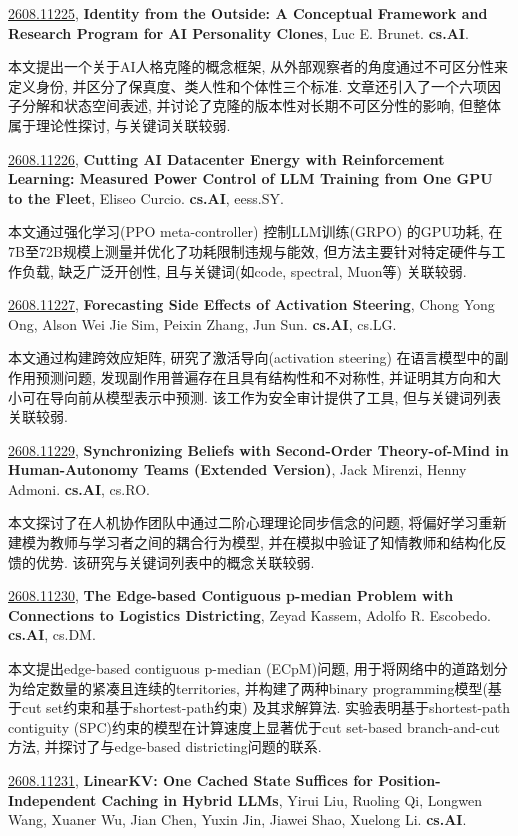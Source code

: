 \documentclass[9pt, a4paper]{article}
\theoremstyle{plain}
\theoremstyle{definition}
\theoremstyle{remark}
\newcommand{\arxivwithtarget}[3]{\hypertarget{#1}{}\href{https://arxiv.org/abs/#1}{#1}, \textbf{\textcolor{arxivblue}{#2}}, #3. }
\begin{document}
\arxivwithtarget{2608.11225}{Identity from the Outside: A Conceptual Framework and Research Program for AI Personality Clones}{Luc E. Brunet}\textbf{cs.AI}.

本文提出一个关于AI人格克隆的概念框架, 从外部观察者的角度通过不可区分性来定义身份, 并区分了保真度、类人性和个体性三个标准. 文章还引入了一个六项因子分解和状态空间表述, 并讨论了克隆的版本性对长期不可区分性的影响, 但整体属于理论性探讨, 与关键词关联较弱.


\arxivwithtarget{2608.11226}{Cutting AI Datacenter Energy with Reinforcement Learning: Measured Power Control of LLM Training from One GPU to the Fleet}{Eliseo Curcio}\textbf{cs.AI}, eess.SY.

本文通过强化学习(PPO meta-controller) 控制LLM训练(GRPO) 的GPU功耗, 在7B至72B规模上测量并优化了功耗限制违规与能效, 但方法主要针对特定硬件与工作负载, 缺乏广泛开创性, 且与关键词(如code, spectral, Muon等) 关联较弱.


\arxivwithtarget{2608.11227}{Forecasting Side Effects of Activation Steering}{Chong Yong Ong, Alson Wei Jie Sim, Peixin Zhang, Jun Sun}\textbf{cs.AI}, cs.LG.

本文通过构建跨效应矩阵, 研究了激活导向(activation steering) 在语言模型中的副作用预测问题, 发现副作用普遍存在且具有结构性和不对称性, 并证明其方向和大小可在导向前从模型表示中预测. 该工作为安全审计提供了工具, 但与关键词列表关联较弱.


\arxivwithtarget{2608.11229}{Synchronizing Beliefs with Second-Order Theory-of-Mind in Human-Autonomy Teams (Extended Version)}{Jack Mirenzi, Henny Admoni}\textbf{cs.AI}, cs.RO.

本文探讨了在人机协作团队中通过二阶心理理论同步信念的问题, 将偏好学习重新建模为教师与学习者之间的耦合行为模型, 并在模拟中验证了知情教师和结构化反馈的优势. 该研究与关键词列表中的概念关联较弱.


\arxivwithtarget{2608.11230}{The Edge-based Contiguous p-median Problem with Connections to Logistics Districting}{Zeyad Kassem, Adolfo R. Escobedo}\textbf{cs.AI}, cs.DM.

本文提出edge-based contiguous p-median (ECpM)问题, 用于将网络中的道路划分为给定数量的紧凑且连续的territories, 并构建了两种binary programming模型(基于cut set约束和基于shortest-path约束) 及其求解算法. 实验表明基于shortest-path contiguity (SPC)约束的模型在计算速度上显著优于cut set-based branch-and-cut方法, 并探讨了与edge-based districting问题的联系.


\arxivwithtarget{2608.11231}{LinearKV: One Cached State Suffices for Position-Independent Caching in Hybrid LLMs}{Yirui Liu, Ruoling Qi, Longwen Wang, Xuaner Wu, Jian Chen, Yuxin Jin, Jiawei Shao, Xuelong Li}\textbf{cs.AI}.
\end{document}
